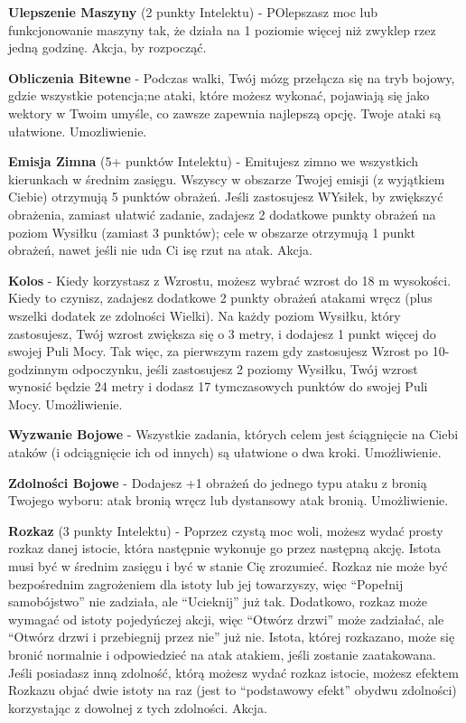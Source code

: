 {\textbf{Ulepszenie Maszyny}\label{sec:Ulepszenie Maszyny} (2 punkty Intelektu) - POlepszasz moc lub funkcjonowanie maszyny tak, że działa na 1 poziomie więcej niż zwyklep rzez jedną godzinę. Akcja, by rozpocząć. 

\textbf{Obliczenia Bitewne}\label{sec:Obliczenia Bitewne} - Podczas walki, Twój mózg przełącza się na tryb bojowy, gdzie wszystkie potencja;ne ataki, które możesz wykonać, pojawiają się jako wektory w Twoim umyśle, co zawsze zapewnia najlepszą opcję. Twoje ataki są ułatwione. Umozliwienie.

\textbf{Emisja Zimna}\label{sec:Emisja Zimna} (5+ punktów Intelektu) - Emitujesz zimno we wszystkich kierunkach w średnim zasięgu. Wszyscy w obszarze Twojej emisji (z wyjątkiem Ciebie) otrzymują 5 punktów obrażeń. Jeśli zastosujesz WYsiłek, by zwiększyć obrażenia, zamiast ułatwić zadanie, zadajesz 2 dodatkowe punkty obrażeń na poziom Wysiłku (zamiast 3 punktów); cele w obszarze otrzymują 1 punkt obrażeń, nawet jeśli nie uda Ci isę rzut na atak. Akcja.

\textbf{Kolos}\label{sec:Kolos} - Kiedy korzystasz z Wzrostu, możesz wybrać wzrost do 18 m wysokości. Kiedy to czynisz, zadajesz dodatkowe 2 punkty obrażeń atakami wręcz (plus wszelki dodatek ze zdolności Wielki). Na każdy poziom Wysiłku, który zastosujesz, Twój wzrost zwiększa się o 3 metry, i dodajesz 1 punkt więcej do swojej Puli Mocy. Tak więc, za pierwszym razem gdy zastosujesz Wzrost po 10-godzinnym odpoczynku, jeśli zastosujesz 2 poziomy Wysiłku, Twój wzrost wynosić będzie 24 metry i dodasz 17 tymczasowych punktów do swojej Puli Mocy. Umożliwienie.

\textbf{Wyzwanie Bojowe}\label{sec:Wyzwanie Bojowe} - Wszystkie zadania, których celem jest ściągnięcie na Ciebi ataków (i odciągnięcie ich od innych) są ułatwione o dwa kroki. Umożliwienie.

\textbf{Zdolności Bojowe}\label{sec:Zdolności Bojowe} - Dodajesz +1 obrażeń do jednego typu ataku z bronią Twojego wyboru: atak bronią wręcz lub dystansowy atak bronią. Umożliwienie.

\textbf{Rozkaz}\label{sec:Rozkaz} (3 punkty Intelektu) - Poprzez czystą moc woli, możesz wydać prosty rozkaz danej istocie, która następnie wykonuje go przez następną akcję. Istota musi być w średnim zasięgu i być w stanie Cię zrozumieć. Rozkaz nie może być bezpośrednim zagrożeniem dla istoty lub jej towarzyszy, więc ``Popełnij samobójstwo'' nie zadziała, ale ``Ucieknij'' już tak. Dodatkowo, rozkaz może wymagać od istoty pojedyńczej akcji, więc ``Otwórz drzwi'' może zadziałać, ale ``Otwórz drzwi i przebiegnij przez nie'' już nie. Istota, której rozkazano, może się bronić normalnie i odpowiedzieć na atak atakiem, jeśli zostanie zaatakowana. Jeśli posiadasz inną zdolność, którą możesz wydać rozkaz istocie, możesz efektem Rozkazu objać dwie istoty na raz (jest to ``podstawowy efekt'' obydwu zdolności) korzystając z dowolnej z tych zdolności. Akcja. 

}
